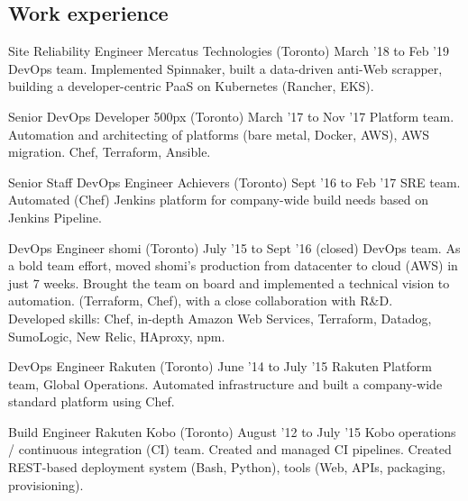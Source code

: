 \documentclass[]{cvpn}
\begin{document}
\cvheader{}

     {\def\gitrev{\unskip}}
     {\def\gitrev{unknown}}
\cvtag{\gitrev}

\begin{multicols}{2}
\section{Work experience}
\begin{eventlist}

\item{Site Reliability Engineer}
     {Mercatus Technologies (Toronto)}
     {March '18 to Feb '19}
{
DevOps team.
Implemented Spinnaker,
built a data-driven anti-Web scrapper,
building a developer-centric PaaS on Kubernetes
(Rancher, EKS).
}

\item{Senior DevOps Developer}
     {500px (Toronto)}
     {March '17 to Nov '17}
{
Platform team.
Automation and architecting of platforms
(bare metal, Docker, AWS),
AWS migration. Chef, Terraform, Ansible.
}

\item{Senior Staff DevOps Engineer}
     {Achievers (Toronto)}
     {Sept '16 to Feb '17}
{
SRE team.
Automated (Chef) Jenkins platform for company-wide build
needs based on Jenkins Pipeline.
}

\item{DevOps Engineer}
     {shomi (Toronto)}
     {July '15 to Sept '16 (closed)}
{
DevOps team. As a bold team effort, moved shomi's
production from datacenter to cloud (AWS) in just 7 weeks.
Brought the team on board and implemented a technical
vision to automation. (Terraform, Chef),
with a close collaboration with R\&D.\\

Developed skills: Chef, in-depth Amazon Web Services,
Terraform, Datadog, SumoLogic, New Relic, HAproxy, npm.
}

\item{DevOps Engineer}
     {Rakuten (Toronto)}
     {June '14 to July '15}
{
Rakuten Platform team, Global Operations.
Automated infrastructure and built a company-wide
standard platform using Chef.
}

\item{Build Engineer}
     {Rakuten Kobo (Toronto)}
     {August '12 to July '15}
{
Kobo operations / continuous integration (CI) team.
Created and managed CI pipelines.
Created REST-based deployment system (Bash, Python),
tools (Web, APIs, packaging, provisioning).\\

}
\end{eventlist}
\end{multicols}
\end{document}
